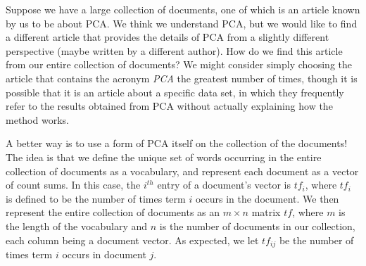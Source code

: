 

Suppose we have a large collection of documents, one of which is an article known by us to be
about PCA. We think we understand PCA, but we would like to find a different article that 
provides the details of PCA from a slightly different perspective 
(maybe written by a different author). 
How do we find this article from our entire collection of documents? 
We might consider simply choosing the article that contains the acronym \emph{PCA} 
the greatest number of times, though it is possible that it is an article about 
a specific data set, in which they frequently refer to the results obtained from PCA without 
actually explaining how the method works.

A better way is to use a form of PCA itself on the collection of the documents! 
The idea is that we define the unique set of words occurring in the entire collection 
of documents as a vocabulary, and represent each document as a vector of count sums. 
In this case, the $i^{th}$ entry of a document's vector is $t\!f_{i}$, 
where $t\!f_{i}$ is defined to be the number of times term $i$ occurs in the document. 
We then represent the entire collection of documents as an $m \times n$ matrix $t\!f$, 
where $m$ is the length of the vocabulary and $n$ is the number of 
documents in our collection, each column being a document vector. 
As expected, we let $t\!f_{ij}$ be the number of times term $i$ occurs in document $j$.

